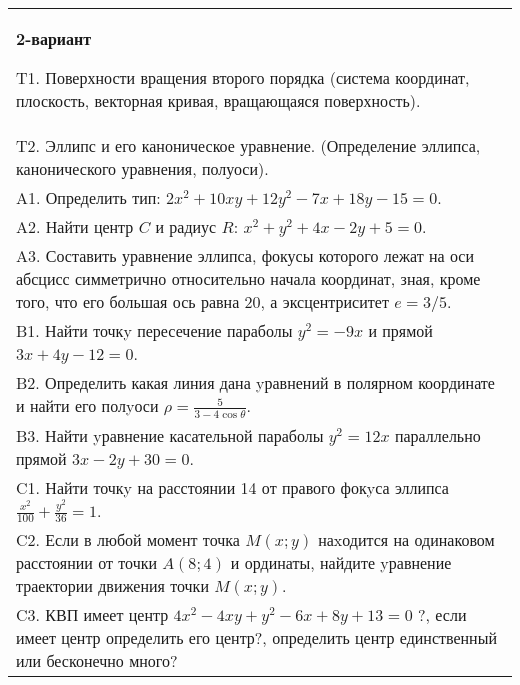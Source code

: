 \documentclass{article}
\begin{document}
\begin{tabular}{m{17cm}}
\textbf{2-вариант}
\newline

T1. Поверхности вращения второго порядка (система координат, плоскость, векторная кривая, вращающаяся поверхность).\\

T2. Эллипс и его каноническое уравнение. (Определение эллипса, канонического уравнения, полуоси).\\

A1. Определить тип: $2x^{2}+10xy+12y^{2}-7x+18y-15=0$.\\

A2. Найти центр $C$ и радиус $R$: $x^2+y^2+4x-2y+5=0$.\\

A3. Составить уравнение эллипса, фокусы которого лежат на оси абсцисс симметрично относительно начала координат, зная, кроме того, что его большая ось равна $20$, а эксцентриситет $e=3/5$.\\

B1. Найти точкy пересечение параболы $y^{2} = - 9x$ и прямой $3x + 4y - 12 = 0$.  \\

B2. Определить какая линия дана yравнений в полярном координате и найти его полyоси $\rho = \frac{5}{3 - 4\cos\theta}$.  \\

B3. Найти yравнение касательной параболы $y^{2} = 12x$ параллельно прямой $3x - 2y + 30 = 0$.  \\

C1. Найти точкy на расстоянии 14 от правого фокyса эллипса $\frac{x^{2}}{100}+\frac{y^{2}}{36}=1$.\\

C2. Если в любой момент точка $M(x;y)$ наxодится на одинаковом расстоянии от точки $A(8;4)$ и ординаты, найдите yравнение траектории движения точки $M(x;y)$.  \\

C3. КВП имеет центр $4x^{2}-4xy+y^{2}-6x+8y+13=0$ ?, если имеет центр определить его центр?, определить центр единственный или бесконечно много?  \\

\end{tabular}
\vspace{1cm}
\end{document}
